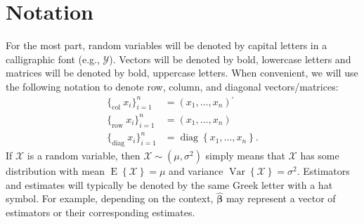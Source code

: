 \documentclass[cmfont,usenames,dvipsnames,leqno]{afit-etd}\usepackage[]{graphicx}\usepackage[]{color}
\newcommand{\trans}{\ensuremath{^\prime}}
\newcommand{\mc}[1]{\ensuremath{\mathcal{#1}}}
\newcommand{\wh}[1]{\ensuremath{\widehat{#1}}}
\newcommand{\E}{\operatorname{E}}
\newcommand{\var}{\operatorname{Var}}
\newcommand{\diag}{\operatorname{diag}}
\begin{document}
\section{Notation}
\label{sec:notation}
For the most part, random variables will be denoted by capital letters in a calligraphic font (e.g., $\mc{Y}$). Vectors will be denoted by bold, lowercase letters and matrices will be denoted by bold, uppercase letters. When convenient, we will use the following notation to denote row, column, and diagonal vectors/matrices:
\begin{align*}
  \Big\lbrace_\text{col } x_i \Big\rbrace_{i = 1}^n &= (x_1, \dotsc, x_n)\trans \\
  \Big\lbrace_\text{row } x_i \Big\rbrace_{i = 1}^n &= (x_1, \dotsc, x_n)  \\
  \Big\lbrace_\text{diag } x_i \Big\rbrace_{i = 1}^n &= \diag\left\{x_1, \dotsc, x_n\right\}.
\end{align*}
If $\mc{X}$ is a random variable, then $\mc{X} \sim (\mu, \sigma^2)$ simply means that $\mc{X}$ has some distribution with mean $\E\left\{\mc{X}\right\} = \mu$ and variance $\var\left\{\mc{X}\right\} = \sigma^2$. Estimators and estimates will typically be denoted by the same Greek letter with a hat symbol. For example, depending on the context, $\wh{\bm{\beta}}$ may represent a vector of estimators or their corresponding estimates.
\end{document}
